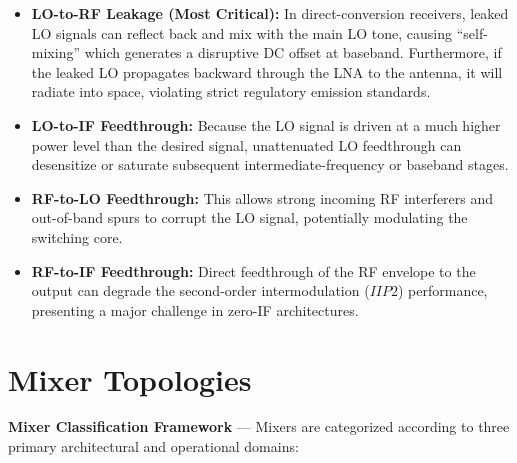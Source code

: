 \begin{itemize}
    \item \textbf{LO-to-RF Leakage (Most Critical):} In direct-conversion receivers, leaked LO signals can reflect back and mix with the main LO tone, causing ``self-mixing'' which generates a disruptive DC offset at baseband. Furthermore, if the leaked LO propagates backward through the LNA to the antenna, it will radiate into space, violating strict regulatory emission standards.
    \item \textbf{LO-to-IF Feedthrough:} Because the LO signal is driven at a much higher power level than the desired signal, unattenuated LO feedthrough can desensitize or saturate subsequent intermediate-frequency or baseband stages.
    \item \textbf{RF-to-LO Feedthrough:} This allows strong incoming RF interferers and out-of-band spurs to corrupt the LO signal, potentially modulating the switching core.
    \item \textbf{RF-to-IF Feedthrough:} Direct feedthrough of the RF envelope to the output can degrade the second-order intermodulation ($IIP2$) performance, presenting a major challenge in zero-IF architectures.
\end{itemize}

\section{Mixer Topologies}

\textbf{Mixer Classification Framework} --- Mixers are categorized according to three primary architectural and operational domains:

